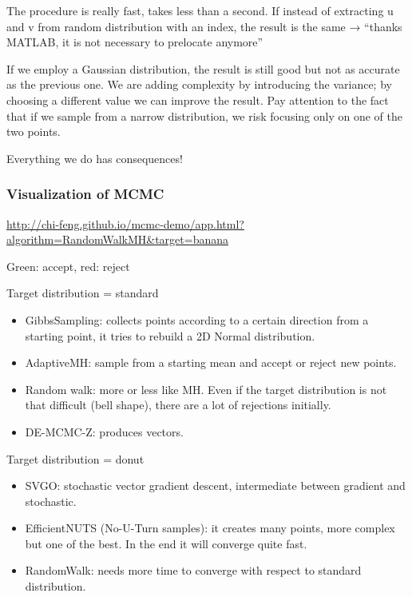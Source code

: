 The procedure is really fast, takes less than a second. If instead of
extracting u and v from random distribution with an index, the result is
the same → ``thanks MATLAB, it is not necessary to prelocate anymore''

If we employ a Gaussian distribution, the result is still good but not
as accurate as the previous one. We are adding complexity by introducing
the variance; by choosing a different value we can improve the result.
Pay attention to the fact that if we sample from a narrow distribution,
we risk focusing only on one of the two points.

Everything we do has consequences!

\hypertarget{visualization-of-mcmc}{%
\subsubsection{Visualization of MCMC}\label{visualization-of-mcmc}}

\url{http://chi-feng.github.io/mcmc-demo/app.html?algorithm=RandomWalkMH\&target=banana}

Green: accept, red: reject

Target distribution = standard

\begin{itemize}
\tightlist
\item
  GibbsSampling: collects points according to a certain direction from a
  starting point, it tries to rebuild a 2D Normal distribution.
\item
  AdaptiveMH: sample from a starting mean and accept or reject new
  points.
\item
  Random walk: more or less like MH. Even if the target distribution is
  not that difficult (bell shape), there are a lot of rejections
  initially.
\item
  DE-MCMC-Z: produces vectors.
\end{itemize}

Target distribution = donut

\begin{itemize}
\tightlist
\item
  SVGO: stochastic vector gradient descent, intermediate between
  gradient and stochastic.
\item
  EfficientNUTS (No-U-Turn samples): it creates many points, more
  complex but one of the best. In the end it will converge quite fast.
\item
  RandomWalk: needs more time to converge with respect to standard
  distribution.
\end{itemize}

